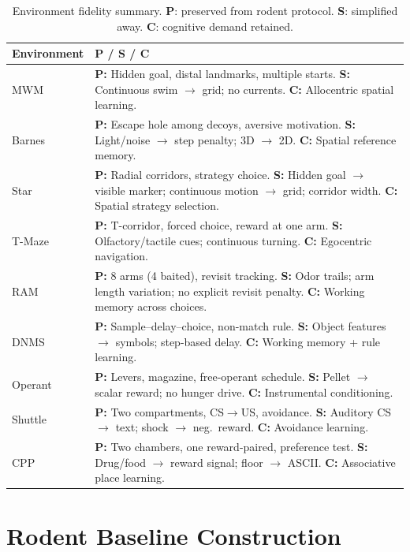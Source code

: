 \documentclass[letterpaper]{article}
\begin{document}
\begin{table}[t]
\centering
\caption{Environment fidelity summary. \textbf{P}: preserved from rodent protocol. \textbf{S}: simplified away. \textbf{C}: cognitive demand retained.}
\label{tab:fidelity}
\footnotesize
\begin{tabular}{@{}lp{14cm}@{}}
\toprule
\textbf{Environment} & \textbf{P / S / C} \\
\midrule
MWM & \textbf{P:} Hidden goal, distal landmarks, multiple starts. \textbf{S:} Continuous swim $\to$ grid; no currents. \textbf{C:} Allocentric spatial learning. \\[3pt]
Barnes & \textbf{P:} Escape hole among decoys, aversive motivation. \textbf{S:} Light/noise $\to$ step penalty; 3D $\to$ 2D. \textbf{C:} Spatial reference memory. \\[3pt]
Star & \textbf{P:} Radial corridors, strategy choice. \textbf{S:} Hidden goal $\to$ visible marker; continuous motion $\to$ grid; corridor width. \textbf{C:} Spatial strategy selection. \\[3pt]
T-Maze & \textbf{P:} T-corridor, forced choice, reward at one arm. \textbf{S:} Olfactory/tactile cues; continuous turning. \textbf{C:} Egocentric navigation. \\[3pt]
RAM & \textbf{P:} 8 arms (4 baited), revisit tracking. \textbf{S:} Odor trails; arm length variation; no explicit revisit penalty. \textbf{C:} Working memory across choices. \\[3pt]
DNMS & \textbf{P:} Sample--delay--choice, non-match rule. \textbf{S:} Object features $\to$ symbols; step-based delay. \textbf{C:} Working memory + rule learning. \\[3pt]
Operant & \textbf{P:} Levers, magazine, free-operant schedule. \textbf{S:} Pellet $\to$ scalar reward; no hunger drive. \textbf{C:} Instrumental conditioning. \\[3pt]
Shuttle & \textbf{P:} Two compartments, CS$\to$US, avoidance. \textbf{S:} Auditory CS $\to$ text; shock $\to$ neg.\ reward. \textbf{C:} Avoidance learning. \\[3pt]
CPP & \textbf{P:} Two chambers, one reward-paired, preference test. \textbf{S:} Drug/food $\to$ reward signal; floor $\to$ ASCII. \textbf{C:} Associative place learning. \\
\bottomrule
\end{tabular}
\end{table}

\section{Rodent Baseline Construction}
\label{app:baselines}
\end{document}

